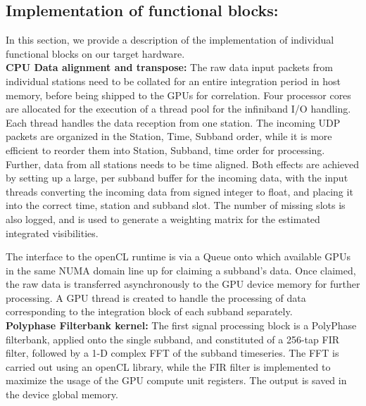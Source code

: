 \documentclass{ws-jai}
\begin{document}
\subsection {Implementation of functional  blocks:} 

In this  section, we provide a  description of the implementation  of individual
functional blocks on our target hardware.\\

\noindent \textbf {CPU  Data alignment  and transpose:}  
The raw data input  packets from individual stations need to  be collated for an
entire integration period  in host memory, before being shipped  to the GPUs for
correlation. Four  processor cores are allocated  for the execution of  a thread
pool for  the infiniband I/O  handling. Each  thread handles the  data reception
from one station. The incoming UDP  packets are organized in the {Station, Time,
  Subband} order,  while it  is more  efficient to  reorder them  into {Station,
  Subband, time} order for processing. Further,  data from all stations needs to
be time aligned.  Both  effects are achieved by setting up  a large, per subband
buffer for  the incoming data,  with the  input threads converting  the incoming
data from signed integer to float, and placing it into the correct time, station
and subband  slot. The number of  missing slots is  also logged, and is  used to
generate a weighting matrix for the estimated integrated visibilities.

The interface to the openCL runtime is  via a Queue onto which available GPUs in
the same NUMA domain  line up for claiming a subband's  data.  Once claimed, the
raw data  is transferred  asynchronously to  the GPU  device memory  for further
processing.  A  GPU  thread  is  created   to  handle  the  processing  of  data
corresponding to the integration block of each subband separately.\\

\noindent \textbf {Polyphase  Filterbank kernel:} The  first signal processing block  is a
PolyPhase  filterbank, applied  onto the  single subband,  and constituted  of a
256-tap FIR filter, followed by a 1-D complex FFT of the subband timeseries. The
FFT is carried out using an openCL  library, while the FIR filter is implemented
to maximize the usage of the GPU  compute unit registers. The output is saved in
the device global memory.\\
\end{document}
